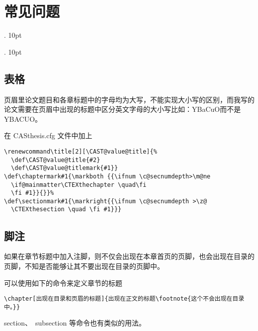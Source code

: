 ﻿
\chapter{常见问题}
\label{chap:faq}

  {}%
  {}%
  {\tt}%
  {}%
  {\bfseries}%
  {.}%
  {10pt}%
  {}%

  {}%
  {}%
  {\rm}%
  {}%
  {\bfseries}%
  {.}%
  {10pt}%
  {}%



\section{表格}

\begin{FAQ}
页眉里论文题目和各章标题中的字母均为大写，不能实现大小写的区别，而我写的论文需要在页眉中出现的标题中区分英文字母的大小写比如：YBaCuO而不是YBACUO。
\end{FAQ}

\begin{ANS}
在 CASthesis.cfg 文件中加上
\begin{verbatim}
\renewcommand\title[2][\CAST@value@title]{%
  \def\CAST@value@title{#2}
  \def\CAST@value@titlemark{#1}}
\def\chaptermark#1{\markboth {{\ifnum \c@secnumdepth>\m@ne
  \if@mainmatter\CTEXthechapter \quad\fi
  \fi #1}}{}}%
\def\sectionmark#1{\markright{{\ifnum \c@secnumdepth >\z@
  \CTEXthesection \quad \fi #1}}}
\end{verbatim}
\end{ANS}


\section{脚注}

\begin{FAQ}
如果在章节标题中加入注脚，则不仅会出现在本章首页的页脚，也会出现在目录的页脚，不知是否能够让其不要出现在目录的页脚中。
\end{FAQ}

\begin{ANS}
可以使用如下的命令来定义章节的标题
\begin{verbatim}
\chapter[出现在目录和页眉的标题]{出现在正文的标题\footnote{这个不会出现在目录中。}}
\end{verbatim}
section、~subsection 等命令也有类似的用法。
\end{ANS}
